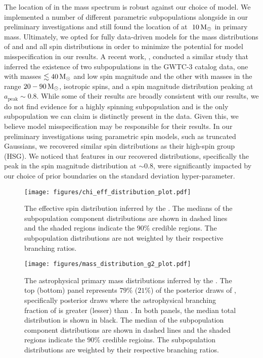 The location of \first{} in the mass spectrum is robust against our choice of model. We implemented a number of different parametric subpopulations alongside \first{} in our preliminary investigations and still found the location of \first{} at $~10{\,\rm M}_\odot$ in primary mass. Ultimately, we opted for fully data-driven models for the mass distributions of \contA{} and \popB{} and all spin distributions in order to minimize the potential for model misspecification in our results. A recent work, \citet{2303.02973}, conducted a similar study that inferred the existence of two subpopulations in the GWTC-3 catalog data, one with masses $\lesssim 40{\,\rm M}_\odot$ and low spin magnitude and the other with masses in the range $20-90{\,\rm M}_\odot$, isotropic spins, and a spin magnitude distribution peaking at $a_\text{peak} \sim 0.8$. While some of their results are broadly consistent with our results, we do not find evidence for a highly spinning subpopulation and \first{} is the only subpopulation we can claim is distinctly present in the data. Given this, we believe model misspecification may be responsible for their results. In our preliminary investigations using parametric spin models, such as truncated Gaussians, we recovered similar spin distributions as their high-spin group (HSG). We noticed that features in our recovered distributions, specifically the peak in the spin magnitude distribution at $\sim 0.8$, were significantly impacted by our choice of prior boundaries on the standard deviation hyper-parameter.


 \begin{figure}[b]
  \begin{centering}
      \texttt{[image: figures/chi\_eff\_distribution\_plot.pdf]}
      \caption{The effective spin distribution inferred by the \comp{}. The medians of the subpopulation component distributions are shown in dashed lines and the shaded regions indicate the $90\%$ credible regions. The subpopulation distributions are not weighted by their respective branching ratios.}
      \label{fig:chi_eff_distributions}
  \end{centering}
\end{figure}

\begin{figure*}[ht!]
  \begin{centering}
      \texttt{[image: figures/mass\_distribution\_g2\_plot.pdf]}
      \caption{The astrophysical primary mass distributions inferred by the \comp{}. The top (bottom) panel represents $79\%$ ($21\%$) of the posterior draws of \comp{}, specifically posterior draws where the astrophysical branching fraction of \contA{} is greater (lesser) than \contB{}. In both panels, the median total distribution is shown in black. The median of the subpopulation component distributions are shown in dashed lines and the shaded regions indicate the $90\%$ credible regioins. The subpopulation distributions are weighted by their respective branching ratios.}
      \label{fig:g2_mass_distribution}
  \end{centering}
\end{figure*} 
